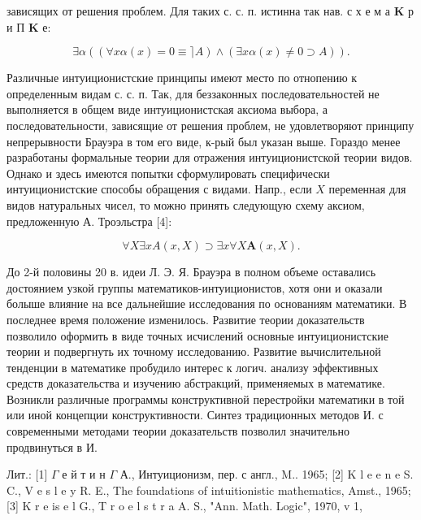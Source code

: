 \documentclass[10pt]{article}
\begin{document}
зависящих от решения проблем. Для таких с. с. п. истинна так нав. с х е м а $\mathbf{K}$ р и П $\mathbf{K}$ е:



\[

\exists \alpha((\forall x \alpha(x)=0 \equiv\rceil A) \wedge(\exists x \alpha(x) \neq 0 \supset A)) .

\]



Различные интуиционистские принципы имеют место по отнопению к определенным видам с. с. п. Так, для беззаконных последовательностей не выполняется в общем виде интуиционистская аксиома выбора, а последовательности, зависящие от решения проблем, не удовлетворяют принципу непрерывности Брауэра в том его виде, к-рый был указан выше. Гораздо менее разработаны формальные теории для отражения интуиционистской теории видов. Однако и здесь имеются попытки сформулировать специфически интуиционистские способы обращения с видами. Напр., если $X$ переменная для видов натуральных чисел, то можно принять следующую схему аксиом, предложенную А. Троэльстра [4]:



\[

\forall X \exists x A(x, X) \supset \exists x \forall X \boldsymbol{A}(x, X) .

\]



До 2-й половины 20 в. идеи Л. Э. Я. Брауэра в полном объеме оставались достоянием узкой группы математиков-интуиционистов, хотя они и оказали болыше влияние на все дальнейшие исследования по основаниям математики. В последнее время положение изменилось. Развитие теории доказательств позволило оформить в виде точных исчислений основные интуиционистские теории и подвергнуть их точному исследованию. Развитие вычислительной тенденции в математике пробудило интерес к логич. анализу эффективных средств доказательства и изучению абстракций, применяемых в математике. Возникли различные программы конструктивной перестройки математики в той или иной концепции конструктивности. Синтез традиционных методов И. с современными методами теории доказательств позволил значительно продвинуться в И.



Лит.: [1] $\Gamma$ е й т и н $\Gamma$ А., Интуиционизм, пер. с англ., M.. 1965; [2] K l e e n e S. C., V e s l e y R. E., The foundations of intuitionistic mathematics, Amst., 1965; [3] K r e is e l G., T r o e l s t r a A. S., "Ann. Math. Logic", 1970, v 1,
\end{document}
